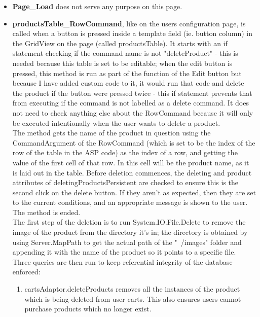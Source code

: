 ﻿\documentclass{article}
\begin{document}
    \begin{itemize}
        \item \textbf{Page\_Load} does not serve any purpose on this page.
        \item \textbf{productsTable\_RowCommand}, like on the users configuration page, is called when a button is pressed inside a template field (ie. button column) in the GridView on the page (called productsTable).
        It starts with an if statement checking if the command name is not "deleteProduct" - this is needed because this table is set to be editable; when the edit button is pressed, this method is run as part of the function of the Edit button but because I have added custom code to it, it would run that code and delete the product if the button were pressed twice - this if statement prevents that from executing if the command is not labelled as a delete command.
        It does not need to check anything else about the RowCommand because it will only be executed intentionally when the user wants to delete a product.
        \\
        The method gets the name of the product in question using the CommandArgument of the RowCommand (which is set to be the index of the row of the table in the ASP code) as the index of a row, and getting the value of the first cell of that row.
        In this cell will be the product name, as it is laid out in the table.
        Before deletion commences, the deleting and product attributes of deletingProductsPersistent are checked to ensure this is the second click on the delete button.
        If they aren't as expected, then they are set to the current conditions, and an appropriate message is shown to the user.
        The method is ended.
        \\
        The first step of the deletion is to run System.IO.File.Delete to remove the image of the product from the directory it's in; the directory is obtained by using Server.MapPath to get the actual path of the "~/images" folder and appending it with the name of the product so it points to a specific file.
        Three queries are then run to keep referential integrity of the database enforced:
        \begin{enumerate}
            \item cartsAdaptor.deleteProducts removes all the instances of the product which is being deleted from user carts.
            This also ensures users cannot purchase products which no longer exist.
            \begin{lstlisting}[language=SQL]

\end{lstlisting}
\end{enumerate}
\end{itemize}
\end{document}
